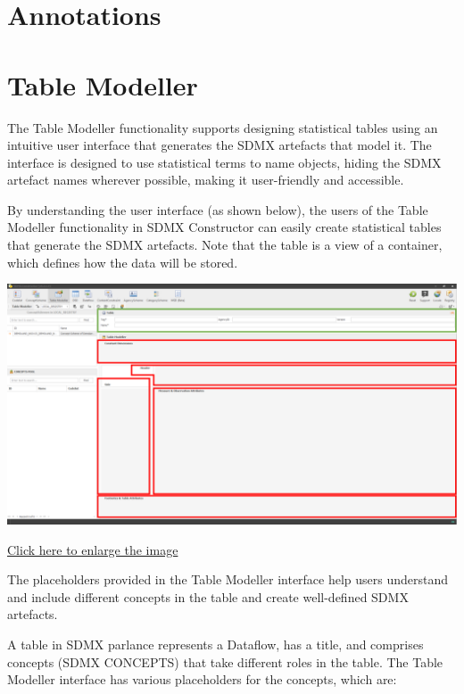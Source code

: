 \documentclass[
]{book}
\begin{document}
\hypertarget{annotations}{%
\section{Annotations}\label{annotations}}

\hypertarget{table-modeller}{%
\section{Table Modeller}\label{table-modeller}}

The Table Modeller functionality supports designing statistical tables using an intuitive user interface that generates the SDMX artefacts that model it. The interface is designed to use statistical terms to name objects, hiding the SDMX artefact names wherever possible, making it user-friendly and accessible.

By understanding the user interface (as shown below), the users of the Table Modeller functionality in SDMX Constructor can easily create statistical tables that generate the SDMX artefacts. Note that the table is a view of a container, which defines how the data will be stored.

\begin{center}\includegraphics[width=1\linewidth]{./images/image234} \end{center}

\href{images/image234.png}{Click here to enlarge the image}

The placeholders provided in the Table Modeller interface help users understand and include different concepts in the table and create well-defined SDMX artefacts.

A table in SDMX parlance represents a Dataflow, has a title, and comprises concepts (SDMX CONCEPTS) that take different roles in the table. The Table Modeller interface has various placeholders for the concepts, which are:
\end{document}
